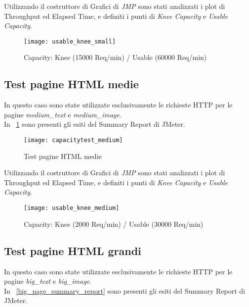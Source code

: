 Utilizzando il costruttore di Grafici di \textit{JMP} sono stati analizzati i plot
di Throughput ed Elapsed Time, e definiti i punti di \textit{Knee Capacity} e
\textit{Usable Capacity}.\\

\begin{figure}[!htbp]
  \centering
  \texttt{[image: usable\_knee\_small]}
  \caption{Capacity: Knee (15000 Req/min) / Usable (60000 Req/min)}
\end{figure}

\subsection{Test pagine HTML medie}
In questo caso sono state utilizzate esclusivamente le richieste HTTP per le pagine
\textit{medium\_text} e \textit{medium\_image}.\\
In \figurename~\ref{medium_page_summary_report} sono presenti gli esiti del
Summary Report di JMeter.\\

\begin{figure}[!htbp]
  \centering
  \texttt{[image: capacitytest\_medium]}
  \caption{Test pagine HTML medie}
  \label{medium_page_summary_report}
\end{figure}

Utilizzando il costruttore di Grafici di \textit{JMP} sono stati analizzati i plot
di Throughput ed Elapsed Time, e definiti i punti di \textit{Knee Capacity} e
\textit{Usable Capacity}.\\

\begin{figure}[!htbp]
  \centering
  \texttt{[image: usable\_knee\_medium]}
  \caption{Capacity: Knee (2000 Req/min) / Usable (30000 Req/min)}
\end{figure}

\clearpage

\subsection{Test pagine HTML grandi}
In questo caso sono state utilizzate esclusivamente le richieste HTTP per le pagine
\textit{big\_text} e \textit{big\_image}.\\
In \figurename~\ref{big_page_summary_report} sono presenti gli esiti del
Summary Report di JMeter.\\

